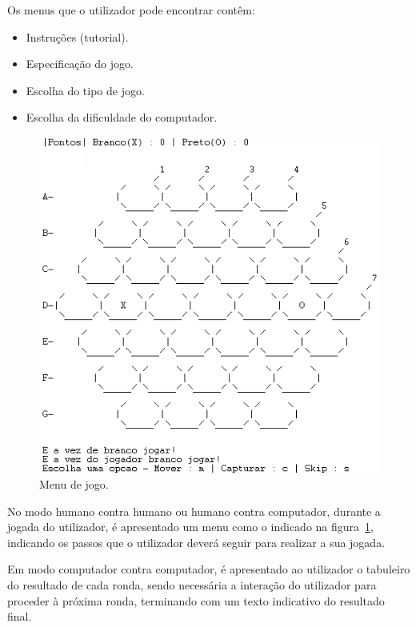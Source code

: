 \documentclass[a4paper]{article}
\begin{document}
Os menus que o utilizador pode encontrar contêm:

\begin{itemize}
	\item Instruções (tutorial).
	\item Especificação do jogo.
	\item Escolha do tipo de jogo.
	\item Escolha da dificuldade do computador.
\end{itemize}

\begin{figure}[h]

    	\centering
     	\includegraphics[scale=0.5]{ingame1}
	\caption{Menu de jogo.}
	\label{fig:figuramenu}

\end{figure}
No modo humano contra humano ou humano contra computador, durante a jogada do utilizador, é apresentado um menu como o indicado na figura~\ref{fig:figuramenu}, indicando os passos que o utilizador deverá seguir para realizar a sua jogada.

Em modo computador contra computador, é apresentado ao utilizador o tabuleiro do resultado de cada ronda, sendo necessária a interação do utilizador para proceder à próxima ronda, terminando com um texto indicativo do resultado final.
\end{document}
